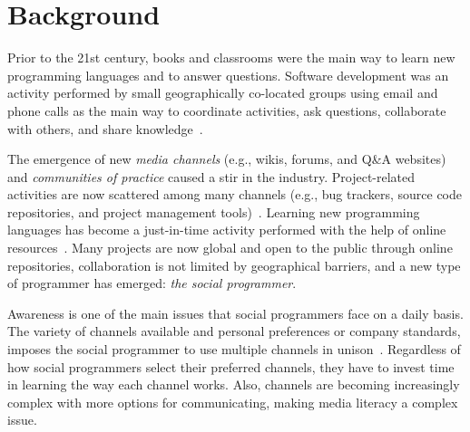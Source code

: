 \documentclass{sig-alternate-05-2015}
\begin{document}



\section{Background}
\label{cha:background}
	Prior to the 21st century, books and classrooms were the main way to learn new programming languages and to answer questions.
	Software development was an activity performed by small geographically co-located groups using email and phone calls as the main way to coordinate activities, ask questions, collaborate with others, and share knowledge~\cite{Storey2014}.

	The emergence of new \textit{media channels} (e.g., wikis, forums, and Q\&A websites) and \textit{communities of practice} caused a stir in the industry.
	Project-related activities are now scattered among many channels (e.g., bug trackers, source code repositories, and project management tools)~\cite{Guzzi2013}.
	Learning new programming languages has become a just-in-time activity performed with the help of online resources~\cite{Sim2013,Storey2010,Hartmann2008}.
	Many projects are now global and open to the public through online repositories, collaboration is not limited by geographical barriers, and a new type of programmer has emerged: \textit{the social programmer}.

	Awareness is one of the main issues that social programmers face on a daily basis.
	The variety of channels available and personal preferences or company standards, imposes the social programmer to use multiple channels in unison~\cite{Storey2010, Storey2014}.
	Regardless of how social programmers select their preferred channels, they have to invest time in learning the way each channel works.
	Also, channels are becoming increasingly complex with more options for communicating, making media literacy a complex issue.
\end{document}
